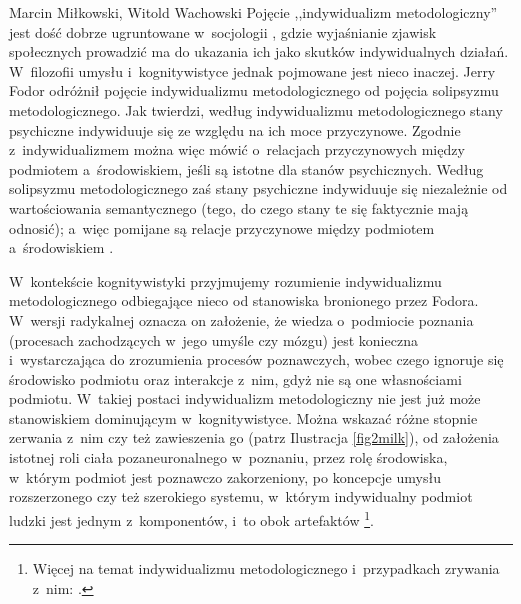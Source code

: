 \begin{artplenv2auth}{Marcin Miłkowski, Witold Wachowski}
Pojęcie ,,indywidualizm metodologiczny'' jest dość dobrze ugruntowane w~socjologii
\parencites[np.][]{schumpeter_wesen_1908}[][]{weber_gospodarka_2002}, %
 gdzie wyjaśnianie zjawisk społecznych prowadzić ma do ukazania ich jako skutków indywidualnych działań. W~filozofii umysłu i~kognitywistyce jednak pojmowane jest nieco inaczej. Jerry Fodor odróżnił pojęcie indywidualizmu metodologicznego od pojęcia solipsyzmu metodologicznego. Jak twierdzi, według indywidualizmu metodologicznego stany psychiczne indywiduuje się ze względu na ich moce przyczynowe. Zgodnie z~indywidualizmem można więc mówić o~relacjach przyczynowych między podmiotem a~środowiskiem, jeśli są istotne dla stanów psychicznych. Według solipsyzmu metodologicznego zaś stany psychiczne indywiduuje się niezależnie od wartościowania semantycznego (tego, do czego stany te się faktycznie mają odnosić); a~więc pomijane są relacje przyczynowe między podmiotem a~środowiskiem 
\parencites[][]{fodor_methodological_1980}[por. też][]{heath_methodological_2020}.%



W~kontekście kognitywistyki przyjmujemy rozumienie indywidualizmu metodologicznego odbiegające nieco od stanowiska bronionego przez Fodora. W~wersji radykalnej oznacza on założenie, że wiedza o~podmiocie poznania (procesach zachodzących w~jego umyśle czy mózgu) jest konieczna i~wystarczająca do zrozumienia procesów poznawczych, wobec czego ignoruje się środowisko podmiotu oraz interakcje z~nim, gdyż nie są one własnościami podmiotu. W~takiej postaci indywidualizm metodologiczny nie jest już może stanowiskiem dominującym w~kognitywistyce. Można wskazać różne stopnie zerwania z~nim czy też zawieszenia go (patrz Ilustracja \ref{fig2milk}), od założenia istotnej roli ciała pozaneuronalnego w~poznaniu, przez rolę środowiska, w~którym podmiot jest poznawczo zakorzeniony, po koncepcje umysłu rozszerzonego czy też szerokiego systemu, w~którym indywidualny podmiot ludzki jest jednym z~komponentów, i~to obok artefaktów%
\footnote{Więcej na temat indywidualizmu metodologicznego i~przypadkach zrywania z~nim: \parencite[][]{wachowski_poznanie_2022}.}.



\end{artplenv2auth}
